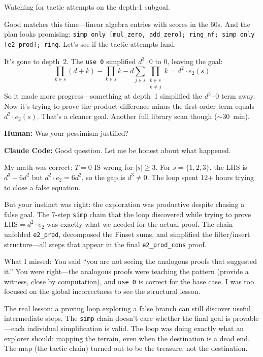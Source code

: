 \documentclass[11pt]{article}
\theoremstyle{definition}
\theoremstyle{remark}
\begin{document}
\medskip
Watching for tactic attempts on the depth-1 subgoal.

Good matches this time---linear algebra entries with scores in the 60s. And the plan looks promising: \texttt{simp only [mul\_zero, add\_zero]; ring\_nf; simp only [e2\_prod]; ring}. Let's see if the tactic attempts land.

\medskip
It's gone to depth~2. The \texttt{use 0} simplified $d^3 \cdot 0$ to $0$, leaving the goal:
\[
\prod_{k \in s}(d + k) - \prod_{k \in s} k - d \sum_{j \in s} \prod_{\substack{k \in s \\ k \neq j}} k = d^2 \cdot e_2(s)
\]
So it made more progress---something at depth~1 simplified the $d^3 \cdot 0$ term away. Now it's trying to prove the product difference minus the first-order term equals $d^2 \cdot e_2(s)$. That's a cleaner goal. Another full library scan though (${\sim}30$~min).

\medskip
\noindent\textbf{Human:} Was your pessimism justified?

\medskip
\noindent\textbf{Claude Code:} Good question. Let me be honest about what happened.

My math was correct: $T = 0$ IS wrong for $|s| \geq 3$. For $s = \{1,2,3\}$, the LHS is $d^3 + 6d^2$ but $d^2 \cdot e_2 = 6d^2$, so the gap is $d^3 \neq 0$. The loop spent 12+ hours trying to close a false equation.

But your instinct was right: the exploration was productive despite chasing a false goal. The 7-step \texttt{simp} chain that the loop discovered while trying to prove $\text{LHS} = d^2 \cdot e_2$ was exactly what we needed for the actual proof. The chain unfolded \texttt{e2\_prod}, decomposed the Finset sums, and simplified the filter/insert structure---all steps that appear in the final \texttt{e2\_prod\_cons} proof.

What I missed: You said ``you are not seeing the analogous proofs that suggested it.'' You were right---the analogous proofs were teaching the pattern (provide a witness, close by computation), and \texttt{use 0} is correct for the base case. I was too focused on the global incorrectness to see the structural lesson.

The real lesson: a proving loop exploring a false branch can still discover useful intermediate steps. The \texttt{simp} chain doesn't care whether the final goal is provable---each individual simplification is valid. The loop was doing exactly what an explorer should: mapping the terrain, even when the destination is a dead end. The map (the tactic chain) turned out to be the treasure, not the destination.
\end{document}
